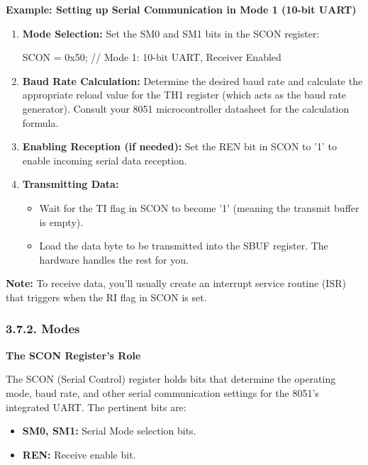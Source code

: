 \documentclass[
]{article}
\newenvironment{Shaded}{}{}
\newcommand{\NormalTok}[1]{#1}
\begin{document}
\textbf{Example: Setting up Serial Communication in Mode 1 (10-bit
UART)}

\begin{enumerate}
\def\labelenumi{\arabic{enumi}.}
\item
  \textbf{Mode Selection:} Set the SM0 and SM1 bits in the SCON
  register:

\begin{Shaded}
\begin{Highlighting}[]
\NormalTok{SCON = 0x50; // Mode 1: 10{-}bit UART, Receiver Enabled}
\end{Highlighting}
\end{Shaded}
\item
  \textbf{Baud Rate Calculation:} Determine the desired baud rate and
  calculate the appropriate reload value for the TH1 register (which
  acts as the baud rate generator). Consult your 8051 microcontroller
  datasheet for the calculation formula.
\item
  \textbf{Enabling Reception (if needed):} Set the REN bit in SCON to
  '1' to enable incoming serial data reception.
\item
  \textbf{Transmitting Data:}

  \begin{itemize}
  \item
    Wait for the TI flag in SCON to become '1' (meaning the transmit
    buffer is empty).
  \item
    Load the data byte to be transmitted into the SBUF register. The
    hardware handles the rest for you.
  \end{itemize}
\end{enumerate}

\textbf{Note:} To receive data, you'll usually create an interrupt
service routine (ISR) that triggers when the RI flag in SCON is set.

\hypertarget{372-modes}{%
\subsubsection{3.7.2. Modes}\label{372-modes}}

\textbf{The SCON Register's Role}

The SCON (Serial Control) register holds bits that determine the
operating mode, baud rate, and other serial communication settings for
the 8051's integrated UART. The pertinent bits are:

\begin{itemize}
\item
  \textbf{SM0, SM1:} Serial Mode selection bits.
\item
  \textbf{REN:} Receive enable bit.
\end{itemize}
\end{document}
